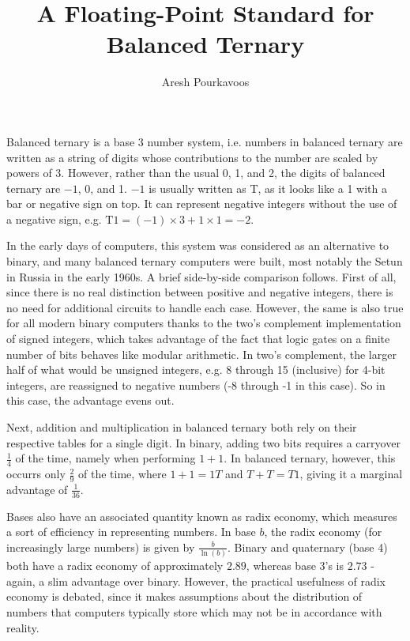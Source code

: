 \documentclass{article}
\begin{document}
\title{A Floating-Point Standard for Balanced Ternary}
\author{Aresh Pourkavoos}
\maketitle

\newcommand{\T}{\mathrm{T}}

Balanced ternary is a base 3 number system,
i.e. numbers in balanced ternary are written as a string of digits
whose contributions to the number are scaled by powers of 3.
However, rather than the usual 0, 1, and 2,
the digits of balanced ternary are $-1$, 0, and 1.
$-1$ is usually written as T, as it looks like a 1 with a bar or negative sign on top.
It can represent negative integers without the use of a negative sign,
e.g. $\T1 = (-1) \times 3 + 1 \times 1= -2$.

In the early days of computers,
this system was considered as an alternative to binary,
and many balanced ternary computers were built,
most notably the Setun in Russia in the early 1960s.
A brief side-by-side comparison follows.
First of all, since there is no real distinction between positive and negative integers,
there is no need for additional circuits to handle each case.
However, the same is also true for all modern binary computers
thanks to the two's complement implementation of signed integers,
which takes advantage of the fact that logic gates on a finite number of bits
behaves like modular arithmetic.
In two's complement, the larger half of what would be unsigned integers,
e.g. 8 through 15 (inclusive) for 4-bit integers,
are reassigned to negative numbers (-8 through -1 in this case).
So in this case, the advantage evens out.

Next, addition and multiplication in balanced ternary
both rely on their respective tables for a single digit.
In binary, adding two bits requires a carryover $\frac{1}{4}$ of the time,
namely when performing $1+1$.
In balanced ternary, however, this occurrs only $\frac{2}{9}$ of the time,
where $1+1=1T$ and $T+T=T1$,
giving it a marginal advantage of $\frac{1}{36}$. 

Bases also have an associated quantity known as radix economy,
which measures a sort of efficiency in representing numbers.
In base $b$, the radix economy (for increasingly large numbers)
is given by $\frac{b}{\ln(b)}$.
Binary and quaternary (base 4) both have
a radix economy of approximately $2.89$,
whereas base 3's is $2.73$ -
again, a slim advantage over binary.
However, the practical usefulness of radix economy is debated,
since it makes assumptions about the distribution
of numbers that computers typically store
which may not be in accordance with reality.
\end{document}
